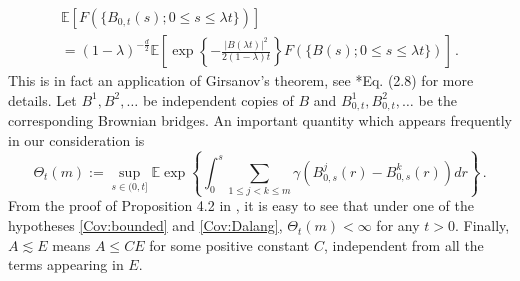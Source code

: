 \documentclass[12pt,reqno]{amsart}
\theoremstyle{remark}
\newcommand{\1}{\mathbf{1}}
\def\EE{\mathbb{E}}
\def\lt{\left}
\def\rt{\right}
\begin{document}
	\begin{multline}\label{id.BBBM}
		\EE\lt[F(\{B_{0,t} (s);0\le s\le \lambda t\}) \rt]
		\\=(1- \lambda)^{-\frac d2}\EE\lt[\exp\lt\{-\frac{|B(\lambda t)|^2}{2(1- \lambda)t} \rt\}F(\{B (s);0\le s\le \lambda t\})  \rt]\,.
	\end{multline}
	This is in fact an application of Girsanov's theorem, see \cite{HLN15}*{Eq. (2.8)} for more details. 
	Let $B^1,B^2,\dots$ be independent copies of $B$ and $B^{1}_{0,t},B^2_{0,t},\dots$ be the corresponding Brownian bridges. An important quantity which appears frequently in our consideration is
	\begin{equation}\label{def:Thetam}
		\Theta_t(m):=\sup_{s\in(0,t]} \EE\exp\lt\{\int_0^s\sum_{1\le j<k\le m}\gamma(B_{0,s}^j(r)-B_{0,s}^k(r))dr \rt\}\,.
	\end{equation}  	   
	From the proof of Proposition 4.2 in \cite{HLN15}, it is easy to see that under one of the hypotheses \ref{Cov:bounded} and \ref{Cov:Dalang}, $\Theta_t(m) < \infty$ for any $t>0$. Finally, $A\lesssim E$ means $A\le CE$ for some positive constant $C$, independent from all the terms appearing in $E$.
\end{document}
